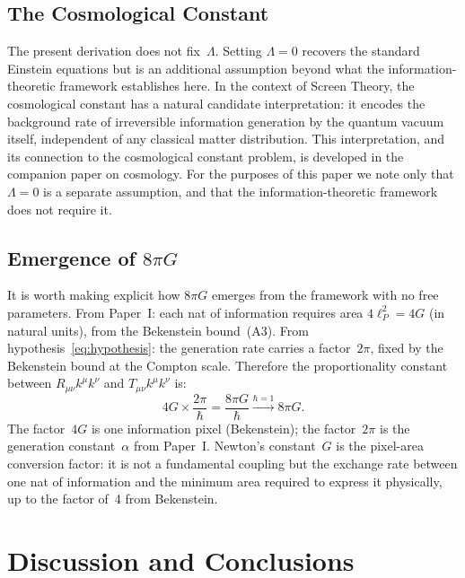 \documentclass[12pt]{article}
\begin{document}
\subsection{The Cosmological Constant}

The present derivation does not fix~$\Lambda$.
Setting $\Lambda=0$ recovers the standard Einstein equations
but is an additional assumption beyond what the information-theoretic
framework establishes here.
In the context of Screen Theory, the cosmological constant has
a natural candidate interpretation: it encodes the background
rate of irreversible information generation by the quantum vacuum
itself, independent of any classical matter distribution.
This interpretation, and its connection to the cosmological
constant problem, is developed in the companion paper on
cosmology.
For the purposes of this paper we note only that
$\Lambda=0$ is a separate assumption, and that the
information-theoretic framework does not require it.

\subsection{Emergence of $8\pi G$}

It is worth making explicit how $8\pi G$ emerges from the
framework with no free parameters.
From Paper~I: each nat of information requires area $4\ell_P^2 = 4G$
(in natural units), from the Bekenstein bound~(A3).
From hypothesis~\eqref{eq:hypothesis}: the generation rate
carries a factor~$2\pi$, fixed by the Bekenstein bound at
the Compton scale.
Therefore the proportionality constant between $R_{\mu\nu}k^\mu k^\nu$
and $T_{\mu\nu}k^\mu k^\nu$ is:
\begin{equation}
  4G \times \frac{2\pi}{\hbar}
  = \frac{8\pi G}{\hbar}
  \xrightarrow{\hbar=1} 8\pi G.
  \label{eq:8piG}
\end{equation}
The factor~$4G$ is one information pixel (Bekenstein);
the factor~$2\pi$ is the generation constant~$\alpha$ from
Paper~I.
Newton's constant~$G$ is the pixel-area conversion factor:
it is not a fundamental coupling but the exchange rate between
one nat of information and the minimum area required to
express it physically, up to the factor of~4 from Bekenstein.

\section{Discussion and Conclusions}
\label{sec:discussion}
\end{document}
